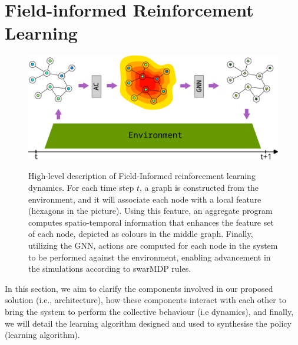 \documentclass[conference]{IEEEtran}
\begin{document}
\section{Field-informed Reinforcement Learning}
\label{sec:approach}
\begin{figure}
  \includegraphics[width=\linewidth]{imgs/architecture.pdf}
  \label{fig:architecture}
  \caption{High-level description of Field-Informed reinforcement learning dynamics. 
  For each time step $t$, a graph is constructed from the environment, and it will associate each node with a local feature (hexagons in the picture). 
  Using this feature, an aggregate program computes spatio-temporal information that enhances the feature set of each node, depicted as colours in the middle graph. 
  Finally, utilizing the GNN, actions are computed for each node in the system to be performed against the environment, enabling advancement in the simulations according to swarMDP rules.
}
\end{figure}
In this section, we aim to clarify the components involved in our proposed solution (i.e., architecture), how these components interact with each other to bring the system to perform the collective behaviour (i.e dynamics), and finally, we will detail the learning algorithm designed and used to synthesise the policy (learning algorithm).
\end{document}
